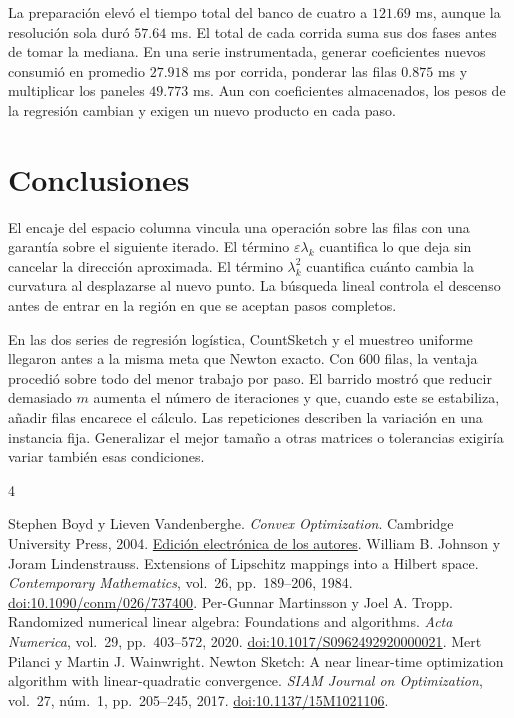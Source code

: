 \documentclass[11pt,a4paper]{article}
\newcommand{\eps}{\varepsilon}
\begin{document}
La preparación elevó el tiempo total del banco de cuatro a $121.69$ ms, aunque la resolución sola duró $57.64$ ms. El total de cada corrida suma sus dos fases antes de tomar la mediana. En una serie instrumentada, generar coeficientes nuevos consumió en promedio $27.918$ ms por corrida, ponderar las filas $0.875$ ms y multiplicar los paneles $49.773$ ms. Aun con coeficientes almacenados, los pesos de la regresión cambian y exigen un nuevo producto en cada paso.

\section{Conclusiones}
El encaje del espacio columna vincula una operación sobre las filas con una garantía sobre el siguiente iterado. El término $\eps\lambda_k$ cuantifica lo que deja sin cancelar la dirección aproximada. El término $\lambda_k^2$ cuantifica cuánto cambia la curvatura al desplazarse al nuevo punto. La búsqueda lineal controla el descenso antes de entrar en la región en que se aceptan pasos completos.

En las dos series de regresión logística, CountSketch y el muestreo uniforme llegaron antes a la misma meta que Newton exacto. Con 600 filas, la ventaja procedió sobre todo del menor trabajo por paso. El barrido mostró que reducir demasiado $m$ aumenta el número de iteraciones y que, cuando este se estabiliza, añadir filas encarece el cálculo. Las repeticiones describen la variación en una instancia fija. Generalizar el mejor tamaño a otras matrices o tolerancias exigiría variar también esas condiciones.
\begin{thebibliography}{4}

\raggedright
{}
Stephen Boyd y Lieven Vandenberghe.
\emph{Convex Optimization}. Cambridge University Press, 2004.
\href{https://web.stanford.edu/~boyd/cvxbook/}{Edición electrónica de los autores}.
William B. Johnson y Joram Lindenstrauss.
Extensions of Lipschitz mappings into a Hilbert space.
\emph{Contemporary Mathematics}, vol.~26, pp.~189--206, 1984.
\href{https://doi.org/10.1090/conm/026/737400}{doi:10.1090/conm/026/737400}.
Per-Gunnar Martinsson y Joel A. Tropp.
Randomized numerical linear algebra: Foundations and algorithms.
\emph{Acta Numerica}, vol.~29, pp.~403--572, 2020.
\href{https://doi.org/10.1017/S0962492920000021}{doi:10.1017/S0962492920000021}.
Mert Pilanci y Martin J. Wainwright.
Newton Sketch: A near linear-time optimization algorithm with linear-quadratic convergence.
\emph{SIAM Journal on Optimization}, vol.~27, núm.~1, pp.~205--245, 2017.
\href{https://doi.org/10.1137/15M1021106}{doi:10.1137/15M1021106}.
\end{thebibliography}
\end{document}
